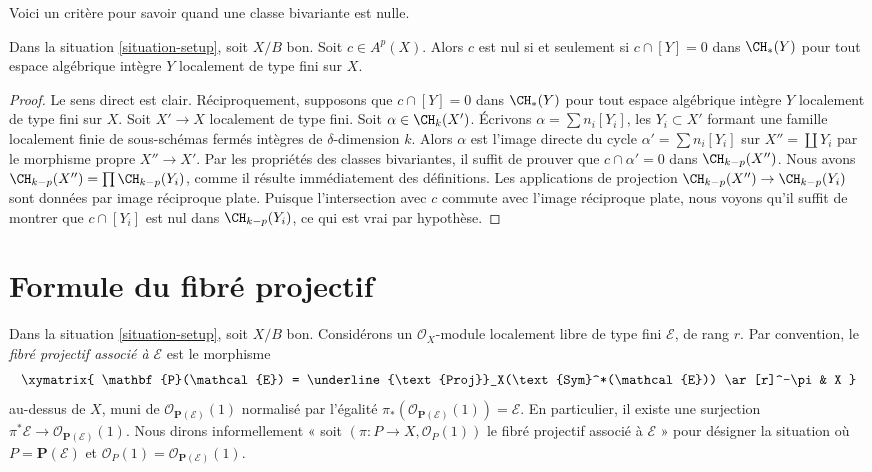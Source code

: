\noindent
Voici un critère pour savoir quand une classe bivariante est nulle.

\begin{lemma}
\label{lemma-bivariant-zero}
Dans la situation \ref{situation-setup}, soit $X/B$ bon. Soit $c
\in A^p(X)$. Alors $c$ est nul si et seulement si $c \cap [Y] = 0$ dans
$\CH_*(Y)$ pour tout espace algébrique intègre $Y$ localement de type fini
sur $X$.
\end{lemma}

\begin{proof}
Le sens direct est clair. Réciproquement, supposons que $c \cap [Y] = 0$ dans
$\CH_*(Y)$ pour tout espace algébrique intègre $Y$ localement de type fini
sur $X$. Soit $X' \to X$ localement de type fini. Soit $\alpha \in
\CH_k(X')$. Écrivons $\alpha = \sum n_i [Y_i]$, les $Y_i \subset X'$ formant une
famille localement finie de sous-schémas fermés intègres de $\delta$-dimension $k$. Alors $\alpha$ est l'image directe du cycle
$\alpha' = \sum n_i[Y_i]$ sur $X'' = \coprod Y_i$ par le morphisme propre
$X'' \to X'$. Par les propriétés des classes bivariantes, il suffit de prouver
que $c \cap \alpha' = 0$ dans $\CH_{k - p}(X'')$. Nous avons $\CH_{k - p}(X'')
= \prod \CH_{k - p}(Y_i)$, comme il résulte immédiatement des définitions. Les applications
de projection $\CH_{k - p}(X'') \to \CH_{k - p}(Y_i)$ sont données par image réciproque
plate. Puisque l'intersection avec $c$ commute avec l'image réciproque plate,
nous voyons qu'il suffit de montrer que $c \cap [Y_i]$ est nul dans $\CH_{k -
p}(Y_i)$, ce qui est vrai par hypothèse.
\end{proof}















\section{Formule du fibré projectif}
\label{section-projective-space-bundle-formula}

\noindent
Dans la situation \ref{situation-setup}, soit $X/B$ bon. Considérons un
$\mathcal{O}_X$-module localement libre de type fini $\mathcal{E}$, de rang
$r$. Par convention, le {\it fibré projectif associé à $\mathcal{E}$} est le
morphisme
$$
\xymatrix{
\mathbf{P}(\mathcal{E}) =
\underline{\text{Proj}}_X(\text{Sym}^*(\mathcal{E}))
\ar[r]^-\pi
& X
}
$$
au-dessus de $X$, muni de $\mathcal{O}_{\mathbf{P}(\mathcal{E})}(1)$ normalisé
par l'égalité $\pi_*(\mathcal{O}_{\mathbf{P}(\mathcal{E})}(1)) = \mathcal{E}$.
En particulier, il existe une surjection $\pi^*\mathcal{E} \to
\mathcal{O}_{\mathbf{P}(\mathcal{E})}(1)$. Nous dirons informellement « soit
$(\pi : P \to X, \mathcal{O}_P(1))$ le fibré projectif associé à
$\mathcal{E}$ » pour désigner la situation où $P = \mathbf{P}(\mathcal{E})$ et
$\mathcal{O}_P(1) = \mathcal{O}_{\mathbf{P}(\mathcal{E})}(1)$.

